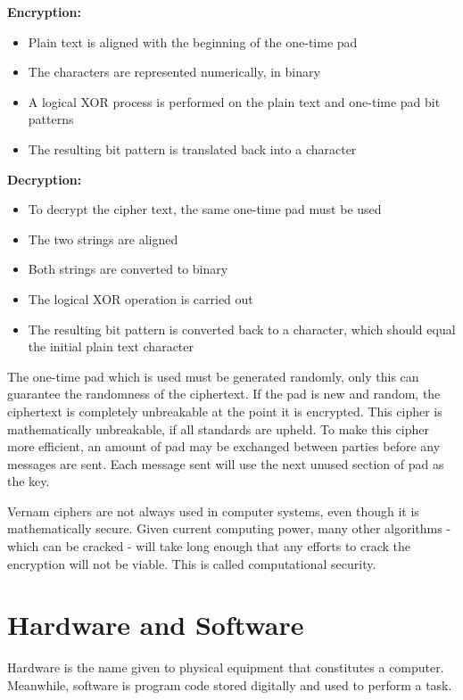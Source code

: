 \documentclass[9pt]{article}
\let\oldsection\section
\renewcommand\section{\clearpage\oldsection}
\begin{document}
\textbf{Encryption:}

\begin{itemize}
\item Plain text is aligned with the beginning of the one-time pad
\item The characters are represented numerically, in binary
\item A logical XOR process is performed on the plain text and one-time pad bit patterns
\item The resulting bit pattern is translated back into a character
\end{itemize}

\textbf{Decryption:}

\begin{itemize}
\item To decrypt the cipher text, the same one-time pad must be used
\item The two strings are aligned
\item Both strings are converted to binary
\item The logical XOR operation is carried out
\item The resulting bit pattern is converted back to a character, which should equal the initial plain text character
\end{itemize}

The one-time pad which is used must be generated randomly, only this can guarantee the randomness of the ciphertext. If the pad is new and random, the ciphertext is completely unbreakable at the point it is encrypted. This cipher is mathematically unbreakable, if all standards are upheld. To make this cipher more efficient, an amount of pad may be exchanged between parties before any messages are sent. Each message sent will use the next unused section of pad as the key.

Vernam ciphers are not always used in computer systems, even though it is mathematically secure. Given current computing power, many other algorithms - which can be cracked - will take long enough that any efforts to crack the encryption will not be viable. This is called computational security.

\section{Hardware and Software}
\label{sec:org09bb612}

Hardware is the name given to physical equipment that constitutes a computer. Meanwhile, software is program code stored digitally and used to perform a task.
\end{document}
